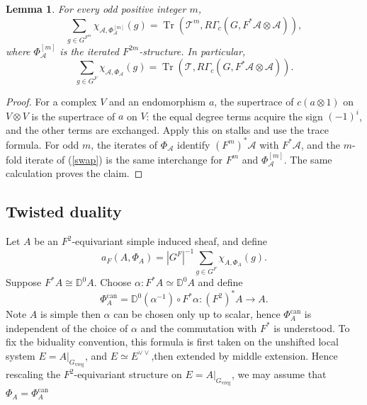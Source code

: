 \documentclass[11pt,letterpaper]{amsart}
\newtheorem{lemma}[theorem]{Lemma}
\theoremstyle{definition}
\numberwithin{equation}{section}
\numberwithin{theorem}{section}
\begin{document}
\begin{lemma}\label{trace-swap-lemma}
For every odd positive integer $m$,
\begin{equation}\label{odd-trace-swap}
 \sum_{g\in G^{F^m}}\chi_{\mathcal A,\Phi_{\mathcal A}^{[m]}}(g)
       =\operatorname{Tr}(\mathcal T^m,R\Gamma_c(G,F^*\mathcal A\otimes\mathcal A)),
\end{equation}
where $\Phi_{\mathcal A}^{[m]}$ is the iterated $F^{2m}$-structure.
In particular,
\begin{equation}\label{trace-swap}
 \sum_{g\in G^F}\chi_{\mathcal A,\Phi_{\mathcal A}}(g)
       =\operatorname{Tr}(\mathcal T,R\Gamma_c(G,F^*\mathcal A\otimes\mathcal A)).
\end{equation}
\end{lemma}
\begin{proof}
For a complex $V$ and an endomorphism $a$, the supertrace of
$c(a\otimes1)$ on $V\otimes V$ is the supertrace of $a$ on $V$:
the equal degree terms acquire the sign $(-1)^i$, and the
other terms are exchanged. Apply this on stalks and use the trace
formula. For odd $m$, the iterates of $\Phi_{\mathcal A}$ identify
$(F^m)^*\mathcal A$ with $F^*\mathcal A$, and the $m$-fold iterate
of (\ref{swap}) is the same interchange for $F^m$ and
$\Phi_{\mathcal A}^{[m]}$. The same calculation proves the claim.
\end{proof}

\subsection{Twisted duality}
Let $A$ be an $F^2$-equivariant simple induced sheaf, and define
\[
 a_F(A,\Phi_A)=|G^F|^{-1}\sum_{g\in G^F}\chi_{A,\Phi_A}(g).
\]
Suppose $F^*A\cong\mathbb D^0A$. Choose
$\alpha:F^*A\simeq\mathbb D^0A$ and define
\begin{equation}\label{canonical-F2}
 \Phi_A^{\mathrm{can}}
       =\mathbb D^0(\alpha^{-1})\circ F^*\alpha:
                  (F^2)^*A\longrightarrow A.
\end{equation}
Note $A$ is simple then $\alpha$ can be chosen only up to scalar, hence $\Phi_A^{\mathrm{can}}$ is independent of the choice of $\alpha$ and the commutation with $F^*$ is understood. To fix the biduality
convention, this formula is first taken on the unshifted local
system $E=A|_{G_{\mathrm{vreg}}}$, and
$E\simeq E^{\vee\vee}$,then extended by middle
extension. Hence rescaling the $F^2$-equivariant structure on
$E=A|_{G_{\mathrm{vreg}}}$, we may assume that
$\Phi_A=\Phi_A^{\mathrm{can}}$
\end{document}
